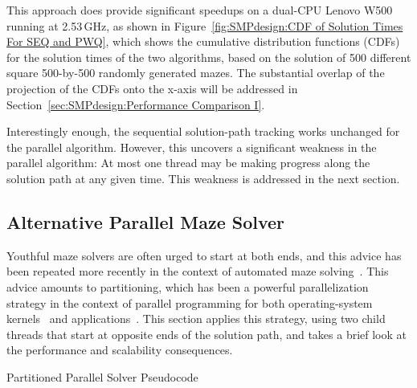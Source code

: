 This approach does provide significant speedups on a dual-CPU
Lenovo W500 running at 2.53\,GHz, as shown in
Figure~\ref{fig:SMPdesign:CDF of Solution Times For SEQ and PWQ},
which shows the cumulative distribution functions (CDFs) for the solution
times of the two algorithms, based on the solution of 500 different square
500-by-500 randomly generated mazes.
The substantial overlap
of the projection of the CDFs onto the x-axis will be addressed in
Section~\ref{sec:SMPdesign:Performance Comparison I}.

Interestingly enough, the sequential solution-path tracking works unchanged
for the parallel algorithm.
However, this uncovers a significant weakness in the parallel algorithm:
At most one thread may be making progress along the solution path at
any given time.
This weakness is addressed in the next section.

\subsection{Alternative Parallel Maze Solver}
\label{sec:SMPdesign:Alternative Parallel Maze Solver}

Youthful maze solvers are often urged to start at both ends, and
this advice has been repeated more recently in the context of automated
maze solving~\cite{UMD:CMSC433maze}.
This advice amounts to partitioning, which has been a powerful
parallelization strategy
in the context of parallel programming for both operating-system
kernels~\cite{Beck85,Inman85} and
applications~\cite{DavidAPatterson2010TroubleMulticore}.
This section applies this strategy, using two child threads that start
at opposite ends of the solution path, and takes a brief look at the
performance and scalability consequences.

\begin{listing}
\begin{fcvlabel}
\end{fcvlabel}
\caption{Partitioned Parallel Solver Pseudocode}
\label{lst:SMPdesign:Partitioned Parallel Solver Pseudocode}
\end{listing}

